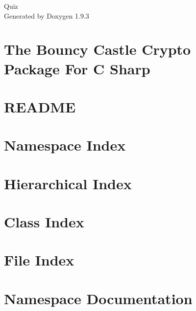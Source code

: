 \documentclass[twoside]{book}
\newcommand{\+}{\discretionary{\mbox{\scriptsize$\hookleftarrow$}}{}{}}
\newcommand{\clearemptydoublepage}{%
    \newpage{\pagestyle{empty}\cleardoublepage}%
  }
\begin{document}
  \raggedbottom
    \hypersetup{pageanchor=false,
                bookmarksnumbered=true,
                pdfencoding=unicode
               }
  \begin{titlepage}
  \vspace*{7cm}
  \begin{center}%
  {\Large Quiz}\\
  \vspace*{1cm}
  {\large Generated by Doxygen 1.9.3}\\
  \end{center}
  \end{titlepage}
  \clearemptydoublepage
  \tableofcontents
  \clearemptydoublepage
  \hypersetup{pageanchor=true}
\chapter{The Bouncy Castle Crypto Package For C Sharp}
\label{md__quiz_main_proiect_packages__bouncy_castle_1_8_5__r_e_a_d_m_e}

\chapter{README}
\label{md__quiz_main__r_e_a_d_m_e}

\chapter{Namespace Index}

\chapter{Hierarchical Index}

\chapter{Class Index}

\chapter{File Index}

\chapter{Namespace Documentation}





\end{document}

